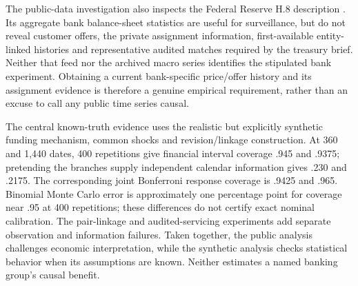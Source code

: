 The public-data investigation also inspects the Federal Reserve H.8
description \citep{fed_h8_dynamic}. Its aggregate bank balance-sheet
statistics are useful for surveillance, but do not reveal customer offers,
the private assignment information, first-available entity-linked histories
and representative audited matches required by the treasury brief. Neither
that feed nor the archived macro series identifies the stipulated bank
experiment. Obtaining a current bank-specific price/offer history and its
assignment evidence is therefore a genuine empirical requirement, rather
than an excuse to call any public time series causal.

The central known-truth evidence uses the realistic but explicitly synthetic
funding mechanism, common shocks and revision/linkage construction. At 360
and 1,440 dates, 400 repetitions give financial interval coverage .945 and
.9375; pretending the branches supply independent calendar information
gives .230 and .2175. The corresponding joint Bonferroni response coverage
is .9425 and .965. Binomial Monte Carlo error is approximately one percentage
point for coverage near .95 at 400 repetitions; these differences do not
certify exact nominal calibration. The pair-linkage and audited-servicing
experiments add separate observation and information failures. Taken
together, the public analysis challenges economic interpretation, while
the synthetic analysis checks statistical behavior when its assumptions
are known. Neither estimates a named banking group's causal benefit.
